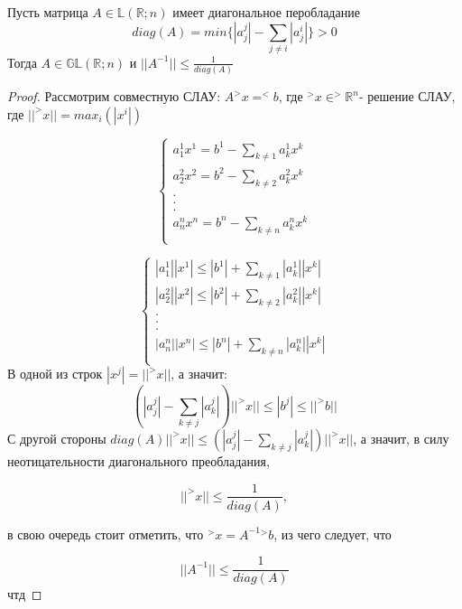 \documentclass[__main__.tex]{subfiles}
\begin{document}
\begin{theorem}
Пусть матрица $A \in \mathbb{L}(\mathbb{R};n)$ имеет диагональное перобладание 
$$diag(A)=min\{|a^j_j|-\sum_{j\neq i} |a_j^i|\}>0$$
Тогда $A \in \mathbb{GL}(\mathbb{R};n)$ и $||A^{-1}||\le \frac{1}{diag(A)}$
\begin{proof}
Рассмотрим совместную СЛАУ:
$A^>x=^<b$, где $^>x\in ^>\mathbb{R}^n$- решение СЛАУ, где $||^>x||=max_i(|x^i|)$

\begin{equation}
\begin{cases}
a_1^1x^1=b^1-\sum_{k\neq 1} a_k^1 x^k\\
a_2^2x^2=b^2-\sum_{k\neq 2} a_k^2 x^k\\
.\\
.\\
.\\
a_n^n x^n=b^n-\sum_{k\neq n} a_k^n x^k\\
\end{cases}
\end{equation}

\begin{equation}
\begin{cases}
|a_1^1||x^1|\le |b^1|+\sum_{k\neq 1} |a_k^1| |x^k|\\
|a_2^2||x^2|\le |b^2|+\sum_{k\neq 2} |a_k^2| |x^k|\\
.\\
.\\
.\\
|a_n^n| |x^n|\le |b^n|+\sum_{k\neq n} |a_k^n| |x^k|\\
\end{cases}
\end{equation}
В одной из строк $|x^j|=||^>x||$, а значит:
$$(|a^j_j|-\sum_{k\neq j} |a_k^j|)||^>x||\le|b^j|\le||^>b||$$
С другой стороны $diag(A) ||^>x||\le(|a^j_j|-\sum_{k\neq j} |a_k^j|)||^>x||$, а значит, в силу неотицательности диагонального преобладания,

$$||^>x||\le \frac{1}{diag(A)},$$

в свою очередь стоит отметить, что ${}^>x=A^{-1} {}^>b$, из чего следует, что 

$$||A^{-1}||\le\frac{1}{diag(A)}$$
чтд
\end{proof}
\end{theorem}
\end{document}
